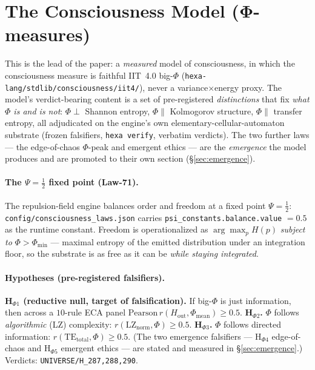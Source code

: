 \documentclass[11pt]{article}
\begin{document}
\section{The Consciousness Model (Φ-measures)}
\label{sec:theory}
This is the lead of the paper: a \emph{measured} model of consciousness, in which the
consciousness measure is faithful IIT~4.0 big-$\Phi$
(\texttt{hexa-lang/stdlib/consciousness/iit4/}), never a variance$\times$energy proxy. The
model's verdict-bearing content is a set of pre-registered \emph{distinctions} that fix
\emph{what $\Phi$ is and is not}: $\Phi\perp$ Shannon entropy, $\Phi\parallel$ Kolmogorov
structure, $\Phi\parallel$ transfer entropy, all adjudicated on the engine's own
elementary-cellular-automaton substrate (frozen falsifiers, \texttt{hexa verify}, verbatim
verdicts). The two further laws --- the edge-of-chaos $\Phi$-peak and emergent ethics --- are
the \emph{emergence} the model produces and are promoted to their own section
(\S\ref{sec:emergence}).

\paragraph{The $\Psi=\tfrac12$ fixed point (Law-71).} The repulsion-field engine
balances order and freedom at a fixed point $\Psi=\tfrac12$:
\texttt{config/consciousness\_laws.json} carries \texttt{psi\_constants.balance.value}
$=0.5$ as the runtime constant. Freedom is operationalized as
$\arg\max_p H(p)$ \emph{subject to} $\Phi>\Phi_{\min}$ --- maximal entropy of the
emitted distribution under an integration floor, so the substrate is as free as it can
be \emph{while staying integrated}.

\paragraph{Hypotheses (pre-registered falsifiers).}
\textbf{H$_{\Phi 1}$ (reductive null, target of falsification).} If big-$\Phi$ is just
information, then across a $10$-rule ECA panel $\mathrm{Pearson}\,r(H_\text{out},
\Phi_\text{mean})\ge0.5$. \textbf{H$_{\Phi 2}$.} $\Phi$ follows \emph{algorithmic}
(LZ) complexity: $r(\mathrm{LZ}_\text{norm},\Phi)\ge0.5$. \textbf{H$_{\Phi 3}$.}
$\Phi$ follows directed information: $r(\mathrm{TE}_\text{total},\Phi)\ge0.5$.
(The two emergence falsifiers --- H$_{\Phi 4}$ edge-of-chaos and H$_{\Phi 5}$ emergent
ethics --- are stated and measured in \S\ref{sec:emergence}.) Verdicts:
\texttt{UNIVERSE/H\_287,288,290}.
\end{document}
